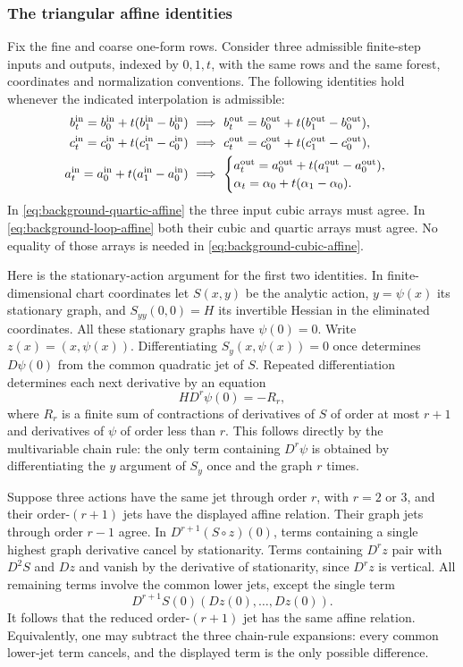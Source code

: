 \subsubsection{The triangular affine identities}
Fix the fine and coarse one-form rows. Consider three admissible
finite-step inputs and outputs, indexed by $0,1,t$, with the same
rows and the same forest, coordinates and normalization conventions.
The following identities hold whenever the indicated interpolation
is admissible:
\begin{align}
 b^{\rm in}_t=b^{\rm in}_0+t(b^{\rm in}_1-b^{\rm in}_0)
 &\ \Longrightarrow\
 b^{\rm out}_t=b^{\rm out}_0+t(b^{\rm out}_1-b^{\rm out}_0),
 \label{eq:background-cubic-affine}\\
 c^{\rm in}_t=c^{\rm in}_0+t(c^{\rm in}_1-c^{\rm in}_0)
 &\ \Longrightarrow\
 c^{\rm out}_t=c^{\rm out}_0+t(c^{\rm out}_1-c^{\rm out}_0),
 \label{eq:background-quartic-affine}\\
 a^{\rm in}_t=a^{\rm in}_0+t(a^{\rm in}_1-a^{\rm in}_0)
 &\ \Longrightarrow\
 \begin{cases}
 a^{\rm out}_t=a^{\rm out}_0+t(a^{\rm out}_1-a^{\rm out}_0),\\
 \alpha_t=\alpha_0+t(\alpha_1-\alpha_0).
 \end{cases}
 \label{eq:background-loop-affine}
\end{align}
In \eqref{eq:background-quartic-affine} the three input cubic arrays
must agree. In \eqref{eq:background-loop-affine} both their cubic
and quartic arrays must agree. No equality of those arrays is needed
in \eqref{eq:background-cubic-affine}.

Here is the stationary-action argument for the first two identities.
In finite-dimensional chart coordinates let $S(x,y)$ be the analytic
action, $y=\psi(x)$ its stationary graph, and
$S_{yy}(0,0)=H$ its invertible Hessian in the eliminated coordinates.
All these stationary graphs have $\psi(0)=0$. Write $z(x)=(x,\psi(x))$.
Differentiating $S_y(x,\psi(x))=0$ once determines $D\psi(0)$
from the common quadratic jet of $S$. Repeated differentiation
determines each next derivative by an equation
\[
 H D^r\psi(0)=-R_r,
\]
where $R_r$ is a finite sum of contractions of derivatives of $S$
of order at most $r+1$ and derivatives of $\psi$ of order less
than $r$. This follows directly by the multivariable chain rule:
the only term containing $D^r\psi$ is obtained by differentiating
the $y$ argument of $S_y$ once and the graph $r$ times.

Suppose three actions have the same jet through order $r$, with
$r=2$ or $3$, and their order-$(r+1)$ jets have the displayed
affine relation. Their graph jets through order $r-1$ agree.
In $D^{r+1}(S\circ z)(0)$, terms containing a single highest
graph derivative cancel by stationarity. Terms containing
$D^r z$ pair with $D^2S$ and $Dz$ and vanish by the derivative
of stationarity, since $D^r z$ is vertical. All remaining terms
involve the common lower jets, except the single term
\[
                       D^{r+1}S(0)(Dz(0),\ldots,Dz(0)).
\]
It follows that the reduced order-$(r+1)$ jet has the same affine
relation. Equivalently, one may subtract the three chain-rule
expansions: every common lower-jet term cancels, and the displayed
term is the only possible difference.

